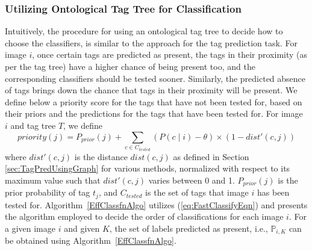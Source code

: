 \subsubsection{Utilizing Ontological Tag Tree for Classification} 
\label{sec:EffClassifnUsingGraph}
Intuitively, the procedure for using an ontological tag tree to decide how to choose the classifiers, is similar to the approach for the tag prediction task. For image $i$, once certain tags are predicted as present, the tags in their proximity (as per the tag tree) have a higher chance of being present too, and the corresponding classifiers should be tested sooner. Similarly, the predicted absence of tags brings down the chance that tags in their proximity will be present. We define below a priority score for the tags that have not been tested for, based on their priors and the predictions for the tags that have been tested for. For image $i$ and tag tree $T$, we define 
\begin{equation} \label{eq:FastClassifyEqn} 
priority(j) = P_{prior}(j) + \sum_{c \in C_{tested}}  {(P( c \mid i)- \theta) \times  (1-dist'(c, j)) }
\end{equation}
where $dist'(c,j)$ is the distance $dist(c,j)$ as defined in Section \ref{sec:TagPredUsingGraph} for various methods, normalized with respect to its maximum value such that $dist'(c,j)$ varies between 0 and 1. $P_{prior}(j)$ is the prior probability of tag $t_j$, and $C_{tested}$ is the set of tags that image $i$ has been tested for. Algorithm~\ref{EffClassfnAlgo} utilizes (\ref{eq:FastClassifyEqn}) and presents the algorithm employed to decide the order of classifications for each image $i$. For a given image $i$ and given $K$, the set of labels predicted as present, i.e., $\mathbb{P}_{i,K}$ can be obtained using Algorithm~\ref{EffClassfnAlgo}. \\ 
